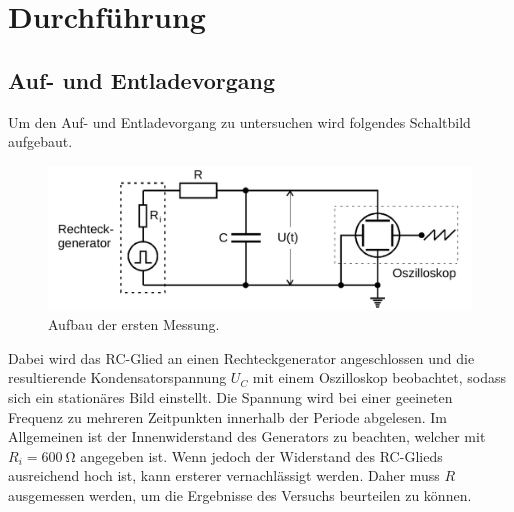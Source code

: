 \section{Durchführung}
\label{sec:Durchführung}
\subsection{Auf- und Entladevorgang}
Um den Auf- und Entladevorgang zu untersuchen wird folgendes Schaltbild aufgebaut.
\begin{figure}[H]
    \centering
    \includegraphics[width=\textwidth]{content/aufbau1.png}
    \caption{Aufbau der ersten Messung.\cite{v353}}
    \label{fig:mess1}
\end{figure}
\noindent
Dabei wird das RC-Glied an einen Rechteckgenerator angeschlossen und die resultierende Kondensatorspannung $U_C$ mit einem Oszilloskop beobachtet, sodass sich ein stationäres Bild einstellt. Die Spannung wird bei einer geeineten Frequenz zu mehreren Zeitpunkten innerhalb der Periode abgelesen.
Im Allgemeinen ist der Innenwiderstand des Generators zu beachten, welcher mit \mbox{$R_i=\SI{600}{\ohm}$\cite{v353}} angegeben ist. Wenn jedoch der Widerstand des RC-Glieds ausreichend hoch ist, kann ersterer vernachlässigt werden. Daher muss $R$ ausgemessen werden, um die Ergebnisse des Versuchs beurteilen zu können.
%

